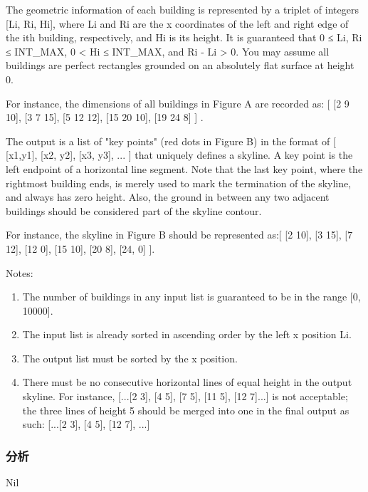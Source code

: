 The geometric information of each building is represented by a triplet of integers [Li, Ri, Hi], where Li and Ri are the x coordinates of the left and right edge of the ith building, respectively, and Hi is its height. It is guaranteed that 0 ≤ Li, Ri ≤ INT_MAX, 0 < Hi ≤ INT_MAX, and Ri - Li > 0. You may assume all buildings are perfect rectangles grounded on an absolutely flat surface at height 0.

For instance, the dimensions of all buildings in Figure A are recorded as: [ [2 9 10], [3 7 15], [5 12 12], [15 20 10], [19 24 8] ] .

The output is a list of "key points" (red dots in Figure B) in the format of [ [x1,y1], [x2, y2], [x3, y3], ... ] that uniquely defines a skyline. A key point is the left endpoint of a horizontal line segment. Note that the last key point, where the rightmost building ends, is merely used to mark the termination of the skyline, and always has zero height. Also, the ground in between any two adjacent buildings should be considered part of the skyline contour.

For instance, the skyline in Figure B should be represented as:[ [2 10], [3 15], [7 12], [12 0], [15 10], [20 8], [24, 0] ].



Notes:

\begin{enumerate}
\item The number of buildings in any input list is guaranteed to be in the range [0, 10000].
\item The input list is already sorted in ascending order by the left x position Li.
\item The output list must be sorted by the x position.
\item There must be no consecutive horizontal lines of equal height in the output skyline. For instance, [...[2 3], [4 5], [7 5], [11 5], [12 7]...] is not acceptable; the three lines of height 5 should be merged into one in the final output as such: [...[2 3], [4 5], [12 7], ...]
\end{enumerate}

\subsubsection{分析}
Nil

